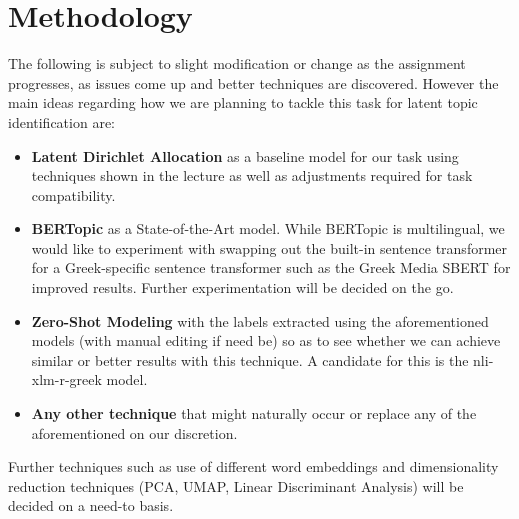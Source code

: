 \section{Methodology}
\label{sec:methodology}

The following is subject to slight modification or change as the assignment progresses, as issues come up and better techniques are discovered. However the main ideas regarding how we are planning to tackle this task for latent topic identification are:
\begin{itemize}
  \item \textbf{Latent Dirichlet Allocation} as a baseline model for our task using techniques shown in the lecture as well as adjustments required for task compatibility.
  \item \textbf{BERTopic}\cite{bertopic} as a State-of-the-Art model. While BERTopic is multilingual, we would like to experiment with swapping out the built-in sentence transformer for a Greek-specific sentence transformer such as the Greek Media SBERT\cite{media_sbert} for improved results. Further experimentation will be decided on the go.
  \item \textbf{Zero-Shot Modeling} with the labels extracted using the aforementioned models (with manual editing if need be) so as to see whether we can achieve similar or better results with this technique. A candidate for this is the nli-xlm-r-greek\cite{zeroshot} model. 
  \item \textbf{Any other technique} that might naturally occur or replace any of the aforementioned on our discretion.
\end{itemize}

Further techniques such as use of different word embeddings and dimensionality reduction techniques (PCA, UMAP, Linear Discriminant Analysis) will be decided on a need-to basis.